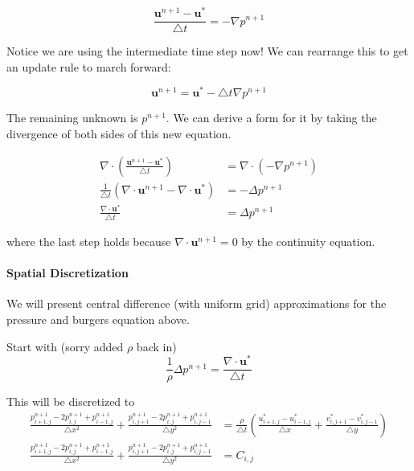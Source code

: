 \documentclass[12pt]{article}
\begin{document}
\begin{equation}
    \frac{\mathbf{u}^{n+1} - \mathbf{u}^*}{\bigtriangleup t} = -\nabla p^{n+1}
\end{equation}

Notice we are using the intermediate time step now! We can rearrange this to get an update rule to march forward:

\begin{equation}
    \mathbf{u}^{n+1} = \mathbf{u}^* - \bigtriangleup t \nabla p^{n+1}
\end{equation}

The remaining unknown is $p^{n+1}$. We can derive a form for it by taking the divergence of both sides of this new equation.

\begin{align*}
    \nabla \cdot (\frac{\mathbf{u}^{n+1} - \mathbf{u}^*}{\bigtriangleup t}) &= \nabla \cdot (-\nabla p^{n+1}) \\
    \frac{1}{\bigtriangleup t}(\nabla \cdot \mathbf{u}^{n+1} - \nabla \cdot \mathbf{u}^*) &= -\Delta p^{n+1} \\
    \frac{\nabla \cdot \mathbf{u}^*}{\bigtriangleup t} &= \Delta p^{n+1}
\end{align*}

where the last step holds because $\nabla \cdot \mathbf{u}^{n+1} = 0$ by the continuity equation.

\paragraph{Spatial Discretization}

We will present central difference (with uniform grid) approximations for the pressure and burgers equation above.

Start with (sorry added $\rho$ back in)
\begin{equation}
\frac{1}{\rho} \Delta p^{n+1} = \frac{\nabla \cdot \mathbf{u}^*}{\bigtriangleup t}
\end{equation}

This will be discretized to
\begin{align*}
    \frac{p^{n+1}_{i+1,j} - 2p^{n+1}_{i,j} + p^{n+1}_{i-1,j}}{\bigtriangleup x^2} + \frac{p^{n+1}_{i,j+1} - 2p^{n+1}_{i,j} + p^{n+1}_{i,j-1}}{\bigtriangleup y^2} &= \frac{\rho}{\bigtriangleup t}(\frac{u^*_{i+1,j} - u^*_{i-1,j}}{\bigtriangleup x} + \frac{v^*_{i,j+1} - v^*_{i,j-1}}{\bigtriangleup y}) \\
    \frac{p^{n+1}_{i+1,j} - 2p^{n+1}_{i,j} + p^{n+1}_{i-1,j}}{\bigtriangleup x^2} + \frac{p^{n+1}_{i,j+1} - 2p^{n+1}_{i,j} + p^{n+1}_{i,j-1}}{\bigtriangleup y^2} &= C_{i,j}
\end{align*}
\end{document}
